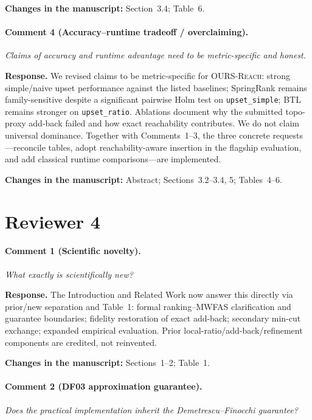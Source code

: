 \documentclass[11pt]{article}
\newcommand{\commentbox}[1]{\par\textit{#1}\par\medskip}
\newcommand{\changes}[1]{\textbf{Changes in the manuscript:} #1\par\medskip}
\begin{document}
\changes{Section~3.4; Table~6.}

\paragraph{Comment 4 (Accuracy--runtime tradeoff / overclaiming).}
\commentbox{Claims of accuracy and runtime advantage need to be metric-specific and honest.}

\noindent\textbf{Response.}
We revised claims to be metric-specific for \textsc{OURS-Reach}: strong simple/naive upset performance against the listed baselines; SpringRank remains family-sensitive despite a significant pairwise Holm test on \texttt{upset\_simple}; BTL remains stronger on \texttt{upset\_ratio}. Ablations document why the submitted topo-proxy add-back failed and how exact reachability contributes. We do not claim universal dominance. Together with Comments~1--3, the three concrete requests---reconcile tables, adopt reachability-aware insertion in the flagship evaluation, and add classical runtime comparisons---are implemented.

\changes{Abstract; Sections~3.2--3.4, 5; Tables~4--6.}

\section*{Reviewer 4}

\paragraph{Comment 1 (Scientific novelty).}
\commentbox{What exactly is scientifically new?}

\noindent\textbf{Response.}
The Introduction and Related Work now answer this directly via prior/new separation and Table~1: formal ranking--MWFAS clarification and guarantee boundaries; fidelity restoration of exact add-back; secondary min-cut exchange; expanded empirical evaluation. Prior local-ratio/add-back/refinement components are credited, not reinvented.

\changes{Sections~1--2; Table~1.}

\paragraph{Comment 2 (DF03 approximation guarantee).}
\commentbox{Does the practical implementation inherit the Demetrescu--Finocchi guarantee?}
\end{document}

